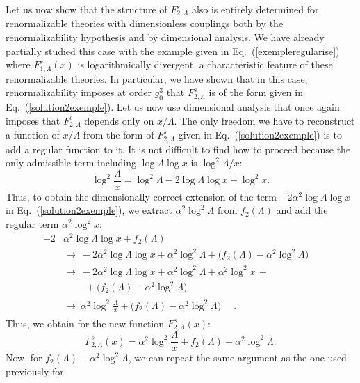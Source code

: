 \documentclass[floatfix,twocolumn,preprintnumbers,amsmath,amssymb,prb]{revtex4}
\newcommand{\be}{\begin{equation}}
\newcommand{\ee}{\end{equation}}
\begin{document}
Let us now show that the structure of $F_{2,\Lambda}^s$ also is 
entirely determined for renormalizable theories with
dimensionless couplings both by the renormalizability hypothesis
and by dimensional analysis. We have already partially studied
this case with the example given in Eq.~(\ref{exempleregularise})
where $F_{1,\Lambda}^s(x)$ is logarithmically divergent, a
characteristic feature of these renormalizable theories. In
particular, we have shown that in this case, renormalizability
imposes at order $g_0^3$ that $F_{2,\Lambda}^s$ is of the form
given in Eq.~(\ref{solution2exemple}). Let us now use dimensional
analysis that once again imposes that $F_{2,\Lambda}^s$ depends
only on $x/\Lambda$. The only freedom we have to reconstruct a
function of $x/\Lambda$ from the form of $F_{2,\Lambda}^s$ given
in Eq.~(\ref{solution2exemple}) is to add a regular function to
it. It is not difficult to find how to proceed because the only
admissible term including $\log\Lambda \log x$ is
$\log^2\Lambda/x$:
\begin{equation}
\log^2\frac{\Lambda}{x}= \log^2 \Lambda - 2 \log\Lambda \log x +
\log^2 x.
\end{equation}
Thus, to obtain the dimensionally correct extension of the term $-2
\alpha^2 \log\Lambda \log x$ in Eq.~(\ref{solution2exemple}), we 
extract $\alpha^2\log^2 \Lambda$ from $f_2(\Lambda)$ and add the
regular term $\alpha^2\log ^2x$:
\be
\begin{array}{ll}
-2& \alpha^2 \log\Lambda \log x + f_2(\Lambda)\\
&\displaystyle{\rightarrow\  -2 \alpha^2 \log\Lambda \log x + \alpha^2 \log^2\Lambda +\big(f_2(\Lambda)-\alpha^2 \log^2\Lambda \big)\phantom{\int}}\\
&\rightarrow\  -2 \alpha^2 \log\Lambda \log x + \alpha^2 \log^2\Lambda + \alpha^2 \log^2 x\, + \\
&\ \ \ \ \ \ \ \ \ \ +\big(f_2(\Lambda)-\alpha^2 \log^2\Lambda \big)\phantom{\int}\\
&\displaystyle{\rightarrow\  \alpha^2\log^2\frac{\Lambda}{x}+ \big(f_2(\Lambda)-\alpha^2 \log^2\Lambda \big)\phantom{\frac{\int}{\int}}}\ \ .
\end{array}
\ee
Thus, we obtain for the new function $F_{2,\Lambda}^s(x)$:
\begin{equation}
F_{2,\Lambda}^s(x)= \alpha^2 \log^2\frac{\Lambda}{x} +
f_2(\Lambda)-\alpha^2
\log^2\Lambda.
\end{equation}
Now, for $f_2(\Lambda)-\alpha^2 \log^2\Lambda$, we can repeat the
same argument as the one used previously for 
\end{document}

